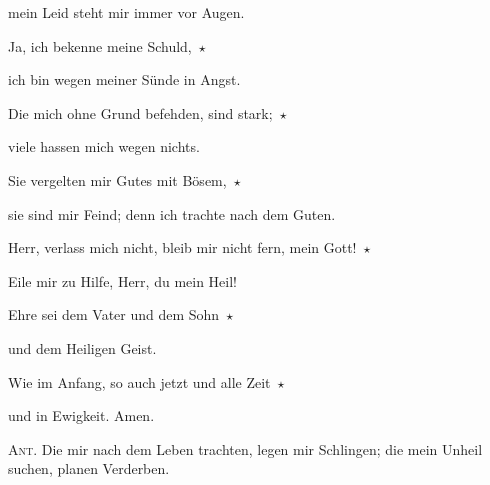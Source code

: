 mein Leid steht mir immer vor Augen.
 
\noindent Ja, ich bekenne meine Schuld,~$\star$~\nopagebreak

ich bin wegen meiner Sünde in Angst.
 
\noindent Die mich ohne Grund befehden, sind stark;~$\star$~\nopagebreak

viele hassen mich wegen nichts.
 
\noindent Sie vergelten mir Gutes mit Bösem,~$\star$~\nopagebreak

sie sind mir Feind; denn ich trachte nach dem Guten.
 
\noindent Herr, verlass mich nicht, bleib mir nicht fern, mein Gott!~$\star$~\nopagebreak

Eile mir zu Hilfe, Herr, du mein Heil!

\noindent Ehre sei dem Vater und dem Sohn~$\star$~\nopagebreak

und dem Heiligen Geist.

\noindent Wie im Anfang, so auch jetzt und alle Zeit~$\star$~\nopagebreak

und in Ewigkeit. Amen.

\vspace{10pt}

\noindent \textsc{Ant.} Die mir nach dem Leben trachten, legen mir Schlingen; die mein Unheil suchen, planen Verderben.

